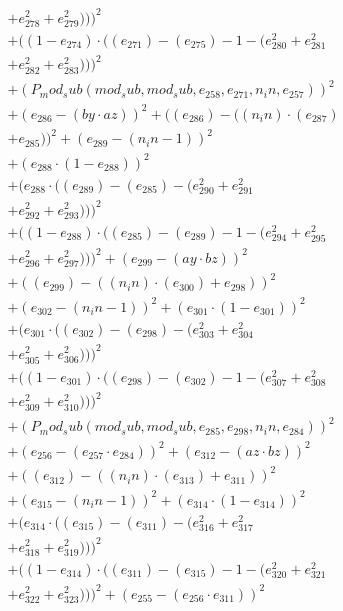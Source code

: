 \documentclass[10pt, a4paper]{article}
\begin{document}
\begin{small}
\begin{align*}
& + e_{278}^{2} + e_{279}^{2})))^{2} \\
& + ((1 - e_{274})  \cdot  ((e_{271}) - (e_{275}) - 1 - (e_{280}^{2} + e_{281}^{2} \\
& + e_{282}^{2} + e_{283}^{2})))^{2} \\
& + (P_mod_sub(mod_sub, mod_sub, e_{258}, e_{271}, n_in, e_{257}))^{2} \\
& + (e_{286} - (by  \cdot  az))^{2} + ((e_{286}) - ((n_in)  \cdot  (e_{287}) \\
& + e_{285}))^{2} + (e_{289} - (n_in - 1))^{2} \\
& + (e_{288}  \cdot  (1 - e_{288}))^{2} \\
& + (e_{288}  \cdot  ((e_{289}) - (e_{285}) - (e_{290}^{2} + e_{291}^{2} \\
& + e_{292}^{2} + e_{293}^{2})))^{2} \\
& + ((1 - e_{288})  \cdot  ((e_{285}) - (e_{289}) - 1 - (e_{294}^{2} + e_{295}^{2} \\
& + e_{296}^{2} + e_{297}^{2})))^{2} + (e_{299} - (ay  \cdot  bz))^{2} \\
& + ((e_{299}) - ((n_in)  \cdot  (e_{300}) + e_{298}))^{2} \\
& + (e_{302} - (n_in - 1))^{2} + (e_{301}  \cdot  (1 - e_{301}))^{2} \\
& + (e_{301}  \cdot  ((e_{302}) - (e_{298}) - (e_{303}^{2} + e_{304}^{2} \\
& + e_{305}^{2} + e_{306}^{2})))^{2} \\
& + ((1 - e_{301})  \cdot  ((e_{298}) - (e_{302}) - 1 - (e_{307}^{2} + e_{308}^{2} \\
& + e_{309}^{2} + e_{310}^{2})))^{2} \\
& + (P_mod_sub(mod_sub, mod_sub, e_{285}, e_{298}, n_in, e_{284}))^{2} \\
& + (e_{256} - (e_{257}  \cdot  e_{284}))^{2} + (e_{312} - (az  \cdot  bz))^{2} \\
& + ((e_{312}) - ((n_in)  \cdot  (e_{313}) + e_{311}))^{2} \\
& + (e_{315} - (n_in - 1))^{2} + (e_{314}  \cdot  (1 - e_{314}))^{2} \\
& + (e_{314}  \cdot  ((e_{315}) - (e_{311}) - (e_{316}^{2} + e_{317}^{2} \\
& + e_{318}^{2} + e_{319}^{2})))^{2} \\
& + ((1 - e_{314})  \cdot  ((e_{311}) - (e_{315}) - 1 - (e_{320}^{2} + e_{321}^{2} \\
& + e_{322}^{2} + e_{323}^{2})))^{2} + (e_{255} - (e_{256}  \cdot  e_{311}))^{2} \\

\end{align*}
\end{small}
\end{document}
